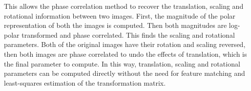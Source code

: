 This allows the phase correlation method to recover the translation, scaling and rotational information between two images. First, the magnitude of the polar representation of both the images is computed. Then both magnitudes are log-polar transformed and phase correlated. This finds the scaling and rotational parameters. Both of the original images have their rotation and scaling reversed, then both images are phase correlated to undo the effects of translation, which is the final parameter to compute. In this way, translation, scaling and rotational parameters can be computed directly without the need for feature matching and least-squares estimation of the transformation matrix. \\

